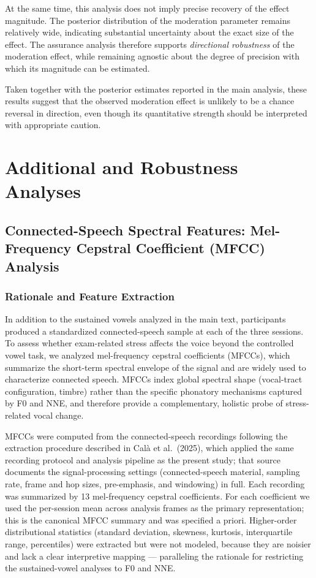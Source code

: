 \documentclass[
  english,
  man,floatsintext]{apa6}
\begin{document}
At the same time, this analysis does not imply precise recovery of the effect magnitude. The posterior distribution of the moderation parameter remains relatively wide, indicating substantial uncertainty about the exact size of the effect. The assurance analysis therefore supports \emph{directional robustness} of the moderation effect, while remaining agnostic about the degree of precision with which its magnitude can be estimated.

Taken together with the posterior estimates reported in the main analysis, these results suggest that the observed moderation effect is unlikely to be a chance reversal in direction, even though its quantitative strength should be interpreted with appropriate caution.

\newpage

\section{Additional and Robustness Analyses}\label{s-additional-robustness}

\subsection{Connected-Speech Spectral Features: Mel-Frequency Cepstral Coefficient (MFCC) Analysis}\label{s-mfcc}

\subsubsection{Rationale and Feature Extraction}\label{rationale-and-feature-extraction}

In addition to the sustained vowels analyzed in the main text, participants produced a standardized connected-speech sample at each of the three sessions. To assess whether exam-related stress affects the voice beyond the controlled vowel task, we analyzed mel-frequency cepstral coefficients (MFCCs), which summarize the short-term spectral envelope of the signal and are widely used to characterize connected speech. MFCCs index global spectral shape (vocal-tract configuration, timbre) rather than the specific phonatory mechanisms captured by F0 and NNE, and therefore provide a complementary, holistic probe of stress-related vocal change.

MFCCs were computed from the connected-speech recordings following the extraction procedure described in Calà et al.~(2025), which applied the same recording protocol and analysis pipeline as the present study; that source documents the signal-processing settings (connected-speech material, sampling rate, frame and hop sizes, pre-emphasis, and windowing) in full. Each recording was summarized by 13 mel-frequency cepstral coefficients. For each coefficient we used the per-session mean across analysis frames as the primary representation; this is the canonical MFCC summary and was specified a priori. Higher-order distributional statistics (standard deviation, skewness, kurtosis, interquartile range, percentiles) were extracted but were not modeled, because they are noisier and lack a clear interpretive mapping --- paralleling the rationale for restricting the sustained-vowel analyses to F0 and NNE.
\end{document}
